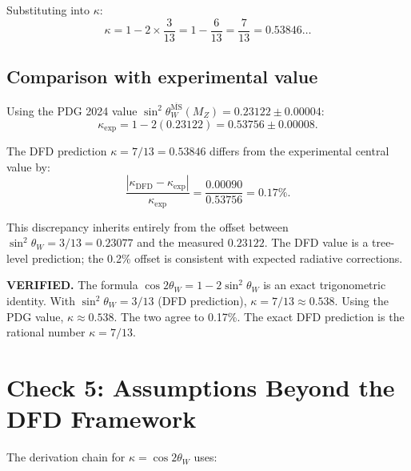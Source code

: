 \documentclass[aps,prd,twocolumn,superscriptaddress,nofootinbib]{revtex4-2}
\begin{document}
Substituting into $\kappa$:
\begin{equation}
\kappa = 1 - 2 \times \frac{3}{13} = 1 - \frac{6}{13}
= \frac{7}{13} = 0.53846\ldots
\label{eq:kappa-exact}
\end{equation}

\subsection{Comparison with experimental value}

Using the PDG 2024 value $\sin^2\theta_W^{\overline{\mathrm{MS}}}(M_Z) = 0.23122 \pm 0.00004$:
\begin{equation}
\kappa_{\mathrm{exp}} = 1 - 2(0.23122) = 0.53756 \pm 0.00008.
\end{equation}

The DFD prediction $\kappa = 7/13 = 0.53846$ differs from the
experimental central value by:
\begin{equation}
\frac{|\kappa_{\mathrm{DFD}} - \kappa_{\mathrm{exp}}|}
{\kappa_{\mathrm{exp}}} = \frac{0.00090}{0.53756} = 0.17\%.
\end{equation}

This discrepancy inherits entirely from the offset between
$\sin^2\theta_W = 3/13 = 0.23077$ and the measured $0.23122$.
The DFD value is a tree-level prediction; the 0.2\% offset
is consistent with expected radiative corrections.

\begin{tcolorbox}[colback=green!5!white, colframe=green!60!black, title=Verdict: Check 4]
\textbf{VERIFIED.}  The formula $\cos 2\theta_W = 1 - 2\sin^2\theta_W$
is an exact trigonometric identity.  With $\sin^2\theta_W = 3/13$
(DFD prediction), $\kappa = 7/13 \approx 0.538$.  Using the PDG value,
$\kappa \approx 0.538$.  The two agree to 0.17\%.  The exact DFD
prediction is the rational number $\kappa = 7/13$.
\end{tcolorbox}


\section{Check 5: Assumptions Beyond the DFD Framework}
\label{sec:check5}

The derivation chain for $\kappa = \cos 2\theta_W$ uses:
\end{document}
